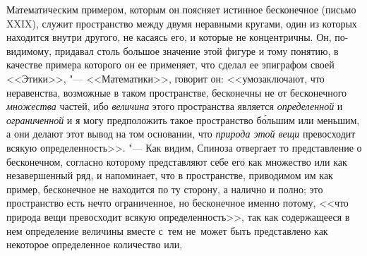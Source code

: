 Математическим примером, которым он поясняет истинное бесконечное (письмо
XXIX), служит пространство между двумя неравными кругами, один из которых
находится внутри другого, не касаясь его, и которые не концентричны. Он,
по-видимому, придавал столь большое значение этой фигуре и тому понятию,
в качестве примера которого он ее
применяет, что сделал ее эпиграфом своей <<Этики>>, "--- <<Математики>>, говорит он: <<умозаключают, что
неравенства, возможные в таком пространстве, бесконечны не от бесконечного
{\em множества} частей, ибо {\em величина} этого пространства является
{\em определенной} и {\em ограниченной} и я могу предположить такое
пространство б\'{о}льшим или меньшим, а они делают этот вывод на том основании,
что {\em природа этой вещи} превосходит всякую
определенность>>. "--- Как
видим, Спиноза отвергает то представление о бесконечном, согласно которому
представляют себе его как множество или как незавершенный ряд, и напоминает,
что в пространстве, приводимом им как пример, бесконечное не находится по ту
сторону, а налично и полно; это пространство есть нечто ограниченное, но
бесконечное именно потому, <<что природа вещи превосходит всякую
определенность>>, так как содержащееся в нем определение величины вместе с~тем
не~может быть представлено как некоторое определенное количество или,
